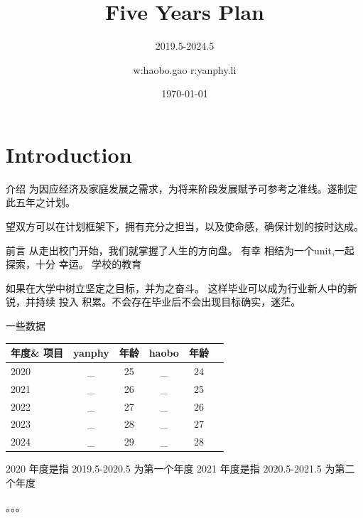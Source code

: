 \documentclass[10pt]{beamer}
\title{Five Years Plan}
\subtitle{2019.5-2024.5}
\date{\today}
\author{w:haobo.gao r:yanphy.li}
\institute{ZhengZhou}
\begin{document}
\begin{frame}
	\titlepage
\end{frame}



\section{Introduction}

\begin{frame}[fragile]{介绍}
		为因应经济及家庭发展之需求，为将来阶段发展赋予可参考之准线。遂制定此五年之计划。

		望双方可以在计划框架下，拥有充分之担当，以及使命感，确保计划的按时达成。
\end{frame}


\begin{frame}[fragile]{前言}
	从走出校门开始，我们就掌握了人生的方向盘。 有幸 相结为一个unit,一起探索，十分
幸运。
	 学校的教育

	 如果在大学中树立坚定之目标，并为之奋斗。 这样毕业可以成为行业新人中的新锐，并持续 投入
积累。不会存在毕业后不会出现目标确实，迷茫。



\end{frame}

\begin{frame}[fragile]{一些数据}
		\begin{center}
		\begin{tabular}{|l|c|c|c|c|c|}
		\hline
		年度\& 项目	&	yanphy & 年龄 & haobo & 年龄 \\
		\hline
		2020 & \_ &	25  &	\_ & 24  \\
		2021 & \_ & 26	& \_ & 25   \\
		2022 & \_ & 27  & \_ & 26  \\
		2023 & \_ & 28  & \_ & 27    \\
		2024 & \_ & 29  & \_ & 28     \\
		\hline
		\end{tabular}
		\end{center}
		2020 年度是指 2019.5-2020.5 为第一个年度
		2021 年度是指 2020.5-2021.5 为第二个年度

		。。。

\end{frame}
\end{document}
